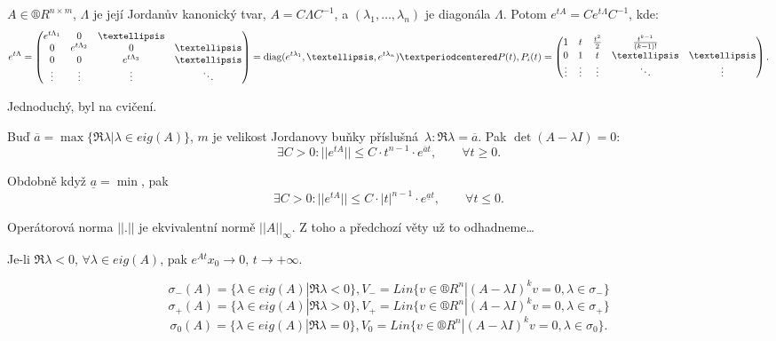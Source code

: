 \documentclass[12pt]{article}					%
\begin{document}

\begin{veta}
	$A \in ®R^{n \times m}$, $\Lambda$ je její Jordanův kanonický tvar, $A = C \Lambda C^{-1}$, a $(\lambda_1, …, \lambda_n)$ je diagonála $\Lambda$. Potom $e^{t A} = C e^{t \Lambda} C^{-1}$, kde:
	$$ e^{t \Lambda} = \begin{pmatrix} e^{t \Lambda_1} & 0 & … \\ 0 & e^{t \Lambda_2} & 0 & … \\ 0 & 0 & e^{t \Lambda_3} & … \\ \vdots & \vdots & \vdots & \ddots \end{pmatrix} = \diag(e^{t \lambda_1}, …, e^{t \lambda_n}) · P(t), P_i(t) = \begin{pmatrix} 1 & t & \frac{t^2}{2} & \frac{t^{k-1}}{(k-1)!} \\ 0 & 1 & t & … & … \\ \vdots & \vdots & \vdots & \ddots & \vdots \end{pmatrix}. $$

	\begin{dukazin}
		Jednoduchý, byl na cvičení.
	\end{dukazin}
\end{veta}

\begin{dusledek}
	Buď $\overline a = \max \{\Re \lambda | \lambda \in eig(A)\}$, $m$ je velikost Jordanovy buňky příslušná $\lambda: \Re \lambda = \overline a$. Pak $\det(A - \lambda I) = 0$:
	$$ \exists C > 0: ||e^{t A}|| ≤ C · t^{n-1}·e^{\overline a t}, \qquad \forall t ≥ 0. $$

	Obdobně když $\underline a = \min$, pak
	$$ \exists C > 0: ||e^{t A}|| ≤ C · |t|^{n-1}·e^{\underline a t}, \qquad \forall t ≤ 0. $$

	\begin{dukazin}
		Operátorová norma $||.||$ je ekvivalentní normě $||A||_∞$. Z toho a předchozí věty už to odhadneme…
	\end{dukazin}
\end{dusledek}

\begin{dusledek}
	Je-li $\Re \lambda < 0$, $\forall \lambda \in eig(A)$, pak $e^{A t} x_0 \rightarrow 0$, $t \rightarrow +∞$.
\end{dusledek}

\begin{definice}
	$$ \sigma_-(A) = \{\lambda \in eig(A) | \Re \lambda < 0\}, V_- = Lin\{v \in ®R^n | (A - \lambda I)^k v = 0, \lambda \in \sigma_-\} $$
	$$ \sigma_+(A) = \{\lambda \in eig(A) | \Re \lambda > 0\}, V_+ = Lin\{v \in ®R^n | (A - \lambda I)^k v = 0, \lambda \in \sigma_+\} $$
	$$ \sigma_0(A) = \{\lambda \in eig(A) | \Re \lambda = 0\}, V_0 = Lin\{v \in ®R^n | (A - \lambda I)^k v = 0, \lambda \in \sigma_0\}. $$
\end{definice}
\end{document}
